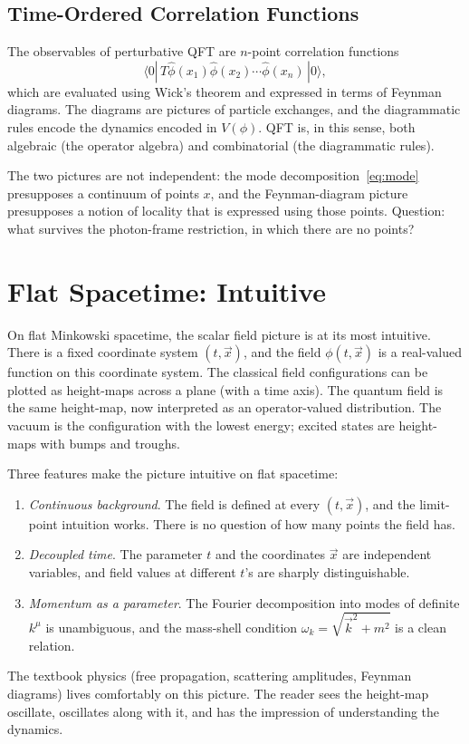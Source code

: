 \documentclass[11pt]{article}
\begin{document}
\subsection{Time-Ordered Correlation Functions}

The observables of perturbative QFT are $n$-point correlation functions
\begin{equation}
\langle 0 |\, T \hat{\phi}(x_1) \hat{\phi}(x_2) \cdots \hat{\phi}(x_n)\, | 0 \rangle,
\label{eq:correlation}
\end{equation}
which are evaluated using Wick's theorem and expressed in terms of Feynman diagrams. The diagrams are pictures of particle exchanges, and the diagrammatic rules encode the dynamics encoded in $V(\phi)$. QFT is, in this sense, both algebraic (the operator algebra) and combinatorial (the diagrammatic rules).

The two pictures are not independent: the mode decomposition~\eqref{eq:mode} presupposes a continuum of points $x$, and the Feynman-diagram picture presupposes a notion of locality that is expressed using those points. Question: what survives the photon-frame restriction, in which there are no points?

\section{Flat Spacetime: Intuitive}
\label{sec:flat}

On flat Minkowski spacetime, the scalar field picture is at its most intuitive. There is a fixed coordinate system $(t, \vec{x})$, and the field $\phi(t, \vec{x})$ is a real-valued function on this coordinate system. The classical field configurations can be plotted as height-maps across a plane (with a time axis). The quantum field is the same height-map, now interpreted as an operator-valued distribution. The vacuum is the configuration with the lowest energy; excited states are height-maps with bumps and troughs.

Three features make the picture intuitive on flat spacetime:
\begin{enumerate}
    \item \emph{Continuous background}. The field is defined at every $(t, \vec{x})$, and the limit-point intuition works. There is no question of how many points the field has.
    \item \emph{Decoupled time}. The parameter $t$ and the coordinates $\vec{x}$ are independent variables, and field values at different $t$'s are sharply distinguishable.
    \item \emph{Momentum as a parameter}. The Fourier decomposition into modes of definite $k^\mu$ is unambiguous, and the mass-shell condition $\omega_k = \sqrt{\vec{k}^2 + m^2}$ is a clean relation.
\end{enumerate}
The textbook physics (free propagation, scattering amplitudes, Feynman diagrams) lives comfortably on this picture. The reader sees the height-map oscillate, oscillates along with it, and has the impression of understanding the dynamics.
\end{document}

